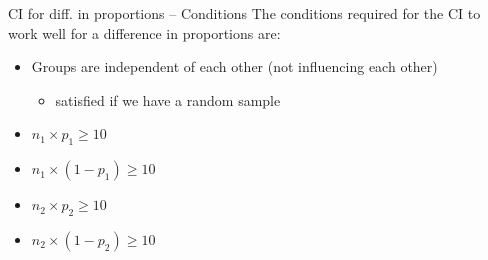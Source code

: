 \documentclass{beamer}
\begin{document}
\begin{frame}{CI for diff. in proportions -- Conditions}
The conditions required for the CI to work well for a difference in proportions are:

\begin{itemize}
    \item Groups are independent of each other (not influencing each other)
    \begin{itemize}
        \item satisfied if we have a random sample
    \end{itemize}
    \item $n_1 \times p_1 \geq 10$
    \item $n_1 \times (1-p_1) \geq 10$
    \item $n_2 \times p_2 \geq 10$
    \item $n_2 \times (1-p_2) \geq 10$
\end{itemize}
    
\end{frame}


%
%
\end{document}
